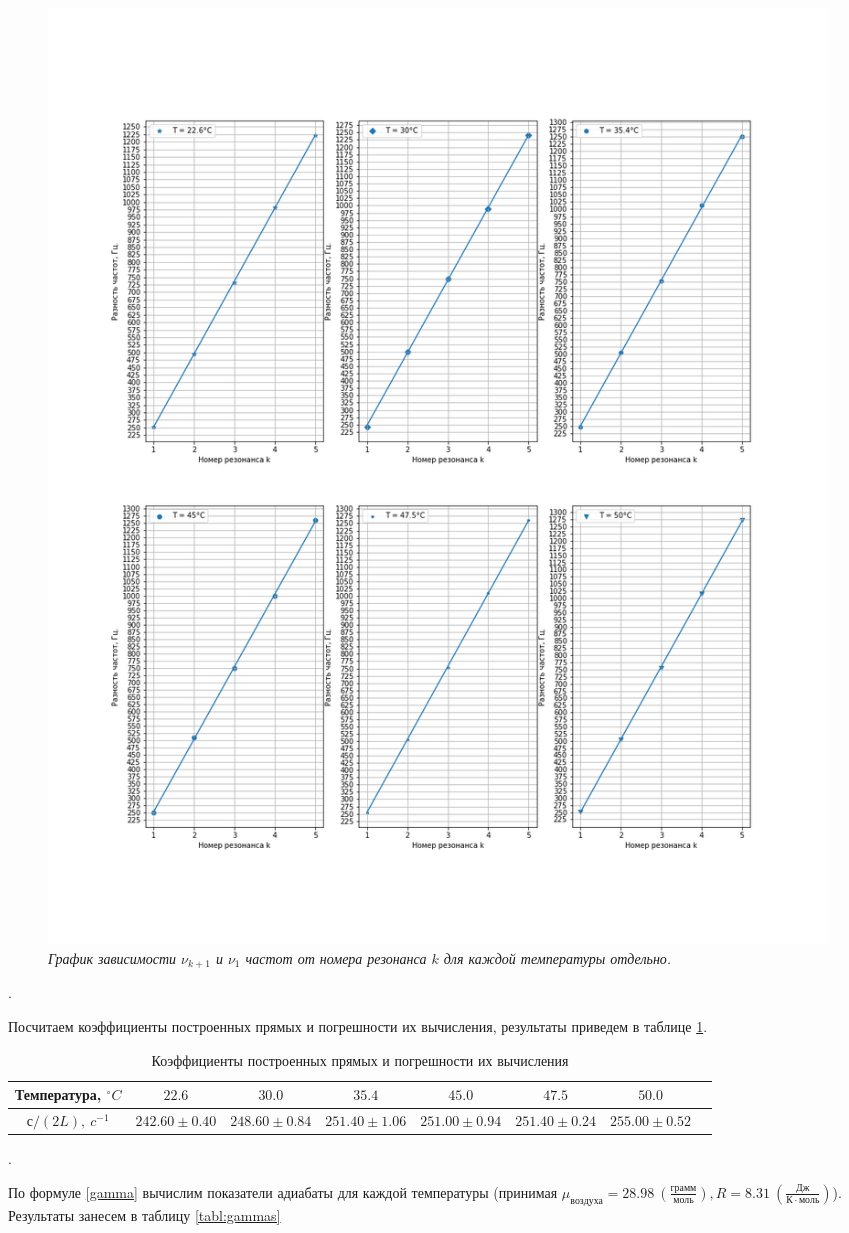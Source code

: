 \documentclass[a4paper, 12pt]{article}
\newcounter{Points}
\newcommand{\point}{\arabic{Points}. \addtocounter{Points}{1}}
\begin{document}
\begin{figure}[hb]
    \centering
    \includegraphics[width=0.7\linewidth]{freqs_to_resonances_in_diff_plots.png}
    \caption{\textit{График зависимости $\nu_{k + 1}$ и $\nu_1$ частот от номера резонанса $k$ для каждой температуры отдельно.}}
    \label{freqs_to_resonances_in_diff_plots}
\end{figure}

\point Посчитаем коэффициенты построенных прямых и погрешности их вычисления, результаты приведем в таблице \ref{tabl:line_coefs}.


\begin{table}[h]
    \centering
    \small
    \setlength\tabcolsep{3pt}

    \begin{tabular}{|c|c|c|c|c|c|c|c|}
    \hline 
    Температура, $^\circ C$ & $22.6$ & $30.0$ & $35.4$ & $45.0$ & $47.5$ & $50.0$ \\ \hline

    $с / \left(2 L\right),~ c^{-1}$ & $242.60 \pm 0.40$ & $248.60 \pm 0.84$ & $251.40 \pm 1.06$ & $251.00 \pm 0.94$ & $251.40 \pm 0.24$ & $255.00 \pm 0.52$ \\ \hline
    \end{tabular}
	\caption{Коэффициенты построенных прямых и погрешности их вычисления}
    \label{tabl:line_coefs}
\end{table}

\point По формуле \ref{gamma} вычислим показатели адиабаты для каждой температуры (принимая $\mu_{воздуха} = 28.98~\left(\frac{грамм}{моль}\right), R = 8.31~\left(\frac{Дж}{К \cdot моль}\right)$). Результаты занесем в таблицу \ref{tabl:gammas}
\end{document}
